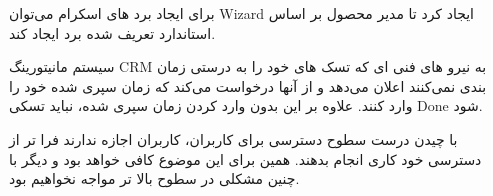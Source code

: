 
برای ایجاد برد های اسکرام می‌توان Wizard ایجاد کرد تا مدیر محصول بر اساس استاندارد تعریف شده برد ایجاد کند.


سیستم مانیتورینگ CRM به نیرو های فنی ای که تسک های خود را به درستی زمان بندی نمی‌کنند اعلان می‌دهد و از آنها درخواست می‌کند که زمان سپری شده خود را وارد کنند.
علاوه بر این بدون وارد کردن زمان سپری شده، نباید تسکی Done شود. 


با چیدن درست سطوح دسترسی برای کاربران، کاربران اجازه ندارند فرا تر از دسترسی خود کاری انجام بدهند. همین برای این موضوع کافی خواهد بود و دیگر با چنین مشکلی در
سطوح بالا تر مواجه نخواهیم بود.
